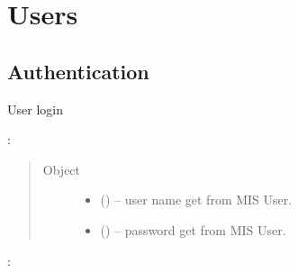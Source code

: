 \documentclass[letterpaper,10pt,english,openany,oneside]{sphinxmanual}
\begin{document}
\section{Users}
\label{\detokenize{api-cmi/v1:users}}

\subsection{Authentication}
\label{\detokenize{api-cmi/v1:authentication}}

\begin{fulllineitems}
\label{\detokenize{api-cmi/v1:post--api-malaria-info-v1-Users-auth}}
\sphinxAtStartPar
User login

\sphinxAtStartPar
{}:

\begin{sphinxVerbatim}[commandchars=\\\{\}]
   
   
\end{sphinxVerbatim}
\begin{quote}\begin{description}
\item[{Object}] \leavevmode\begin{itemize}
\item {} 
\sphinxAtStartPar
{} () – user name get from MIS User.

\item {} 
\sphinxAtStartPar
{} () – password get from MIS User.

\end{itemize}

\end{description}\end{quote}

\sphinxAtStartPar
{}:

\begin{sphinxVerbatim}[commandchars=\\\{\}]
   
   
   
   
   
   
   
\end{sphinxVerbatim}

\end{fulllineitems}
\end{document}
